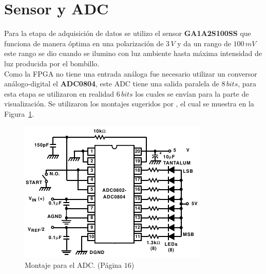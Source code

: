 \documentclass[12pt,graphicx,caption,rotating]{article}
\begin{document}
\section{Sensor y ADC}
\noindent
Para la etapa de adquisición de datos se utilizo el sensor \textbf{GA1A2S100SS}\cite{sensor} que funciona de manera óptima en una polarización de $3\, V$ y da un rango de $100\, mV$ este rango se dio cuando se ilumino con luz ambiente hasta máxima intensidad de luz producida por el bombillo.\\
Como la FPGA no tiene una entrada análoga fue necesario utilizar un conversor análogo-digital el \textbf{ADC0804}\cite{adc}, este ADC tiene una salida paralela de $8\, bits$, para esta etapa se utilizaron en realidad $6\, bits$ los cuales se envían para la parte de visualización. Se utilizaron los montajes sugeridos por \cite{sensor}, el cual se muestra en la Figura~\ref{fig2}.
\begin{figure}[H]
  \centering
    \includegraphics[scale=0.7]{adc.png}
      \caption{Montaje para el ADC.\cite{adc} (Página $16$)}
	\label{fig2}
\end{figure}
\end{document}
